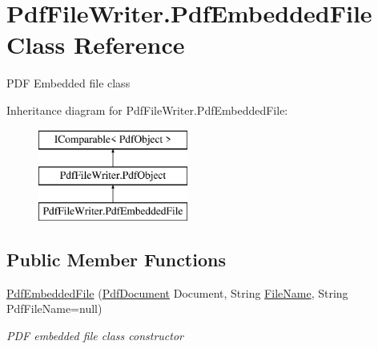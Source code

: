 \hypertarget{class_pdf_file_writer_1_1_pdf_embedded_file}{}\section{Pdf\+File\+Writer.\+Pdf\+Embedded\+File Class Reference}
\label{class_pdf_file_writer_1_1_pdf_embedded_file}


P\+DF Embedded file class  


Inheritance diagram for Pdf\+File\+Writer.\+Pdf\+Embedded\+File\+:\begin{figure}[H]
\begin{center}
\leavevmode
\includegraphics[height=3.000000cm]{class_pdf_file_writer_1_1_pdf_embedded_file}
\end{center}
\end{figure}
\subsection*{Public Member Functions}
\begin{DoxyCompactItemize}
\item 
\hyperlink{class_pdf_file_writer_1_1_pdf_embedded_file_a16b082d6409d1c845b62d22aad2a45f6}{Pdf\+Embedded\+File} (\hyperlink{class_pdf_file_writer_1_1_pdf_document}{Pdf\+Document} Document, String \hyperlink{class_pdf_file_writer_1_1_pdf_embedded_file_a7fa8c0d459e59ec12f7e6aac881be3e1}{File\+Name}, String Pdf\+File\+Name=null)
\begin{DoxyCompactList}\small\item\em P\+DF embedded file class constructor \end{DoxyCompactList}\end{DoxyCompactItemize}

